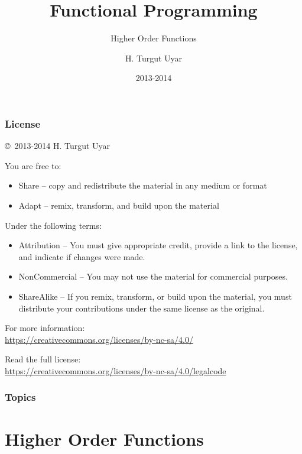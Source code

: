 \documentclass[dvipsnames]{beamer}
\title{Functional Programming}
\subtitle{Higher Order Functions}
\author{H. Turgut Uyar}
\date{2013-2014}
\theoremstyle{plain}
\begin{document}
\begin{frame}
  \titlepage
\end{frame}

\begin{frame}
  \frametitle{License}

  \hfill
  \copyright~2013-2014 H. Turgut Uyar

  \vfill
  \begin{footnotesize}
    You are free to:
    \begin{itemize}
      \itemsep0em
      \item Share -- copy and redistribute the material in any medium or format
      \item Adapt -- remix, transform, and build upon the material
    \end{itemize}

    Under the following terms:
    \begin{itemize}
      \itemsep0em
      \item Attribution -- You must give appropriate credit, provide a link to
        the license, and indicate if changes were made.

      \item NonCommercial -- You may not use the material for commercial
        purposes.

      \item ShareAlike -- If you remix, transform, or build upon the material,
        you must distribute your contributions under the same license as the
        original.
    \end{itemize}
  \end{footnotesize}

  \begin{small}
    For more information:\\
    \url{https://creativecommons.org/licenses/by-nc-sa/4.0/}

    \smallskip
    Read the full license:\\
    \url{https://creativecommons.org/licenses/by-nc-sa/4.0/legalcode}
  \end{small}
\end{frame}

\begin{frame}
  \frametitle{Topics}
  \tableofcontents
\end{frame}

\section{Higher Order Functions}
\end{document}
